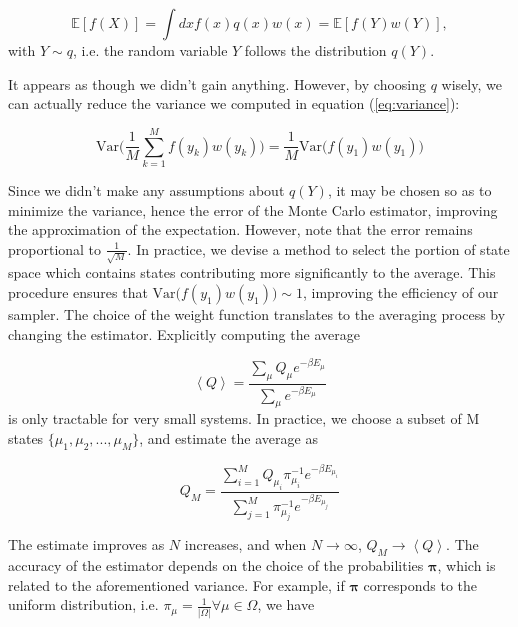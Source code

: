 \begin{equation}
\mathbb{E} [f(X)] = \int dx f(x) q(x) w(x) = \mathbb{E} [f(Y) w(Y)],
\end{equation}
with $Y \sim q$, i.e. the random variable $Y$ follows the distribution $q(Y)$.

It appears as though we didn't gain anything. However, by choosing $q$ wisely, we can actually reduce the variance we computed in equation (\ref{eq:variance}):

\begin{equation}
\text{Var}\bigg( \frac{1}{M} \sum_{k=1}^M f(y_k) w(y_k) \bigg) = \frac{1}{M} \text{Var}\bigg( f(y_1) w(y_1) \bigg)
\end{equation}

Since we didn't make any assumptions about $q(Y)$, it may be chosen so as to minimize the variance, hence the error of the Monte Carlo estimator, improving the approximation of the expectation. However, note that the error remains proportional to $\frac{1}{\sqrt{M}}$.
In practice, we devise a method to select the portion of state space which contains states contributing more significantly to the average.
This procedure ensures that $\text{Var}\big( f(y_1) w(y_1) \big) \sim 1$, improving the efficiency of our sampler.
The choice of the weight function translates to the averaging process by changing the estimator.
Explicitly computing the average

\begin{equation}
\left\langle Q \right\rangle = \frac{ \sum_\mu Q_\mu e^{-\beta E_\mu} }{ \sum_\mu e^{-\beta E_\mu}}
\end{equation}
is only tractable for very small systems.
In practice, we choose a subset of M states $\{\mu_1, \mu_2, ..., \mu_M \} $, and estimate the average as

\begin{equation}
Q_M = \frac{ \sum_{i=1}^M Q_{\mu_i} \pi_{\mu_i}^{-1} e^{ -\beta E_{\mu_i} } }{ \sum_{j=1}^M \pi_{\mu_j}^{-1} e^{ -\beta E_{\mu_j} }  }
\end{equation}

The estimate improves as $N$ increases, and when $N\rightarrow \infty$, $Q_M \rightarrow \left\langle Q \right\rangle$.
The accuracy of the estimator depends on the choice of the probabilities $\bm \pi$, which is related to the aforementioned variance.
For example, if $\bm \pi$ corresponds to the uniform distribution, i.e. $\pi_\mu = \frac{1}{| \Omega |} \forall \mu \in \Omega$, we have

